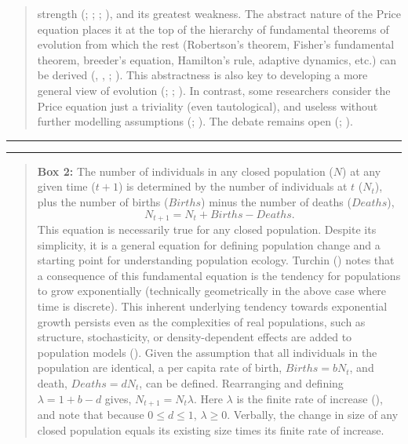 \documentclass[
]{article}
\begin{document}
\begin{quote}
strength (;
; ; ), and its
greatest weakness. The abstract nature of the Price equation places it
at the top of the hierarchy of fundamental theorems of evolution from
which the rest (Robertson's theorem, Fisher's fundamental theorem,
breeder's equation, Hamilton's rule, adaptive dynamics, etc.) can be
derived (,
, ;
). This abstractness is also key
to developing a more general view of evolution
(; ; ). In
contrast, some researchers consider the Price equation just a triviality
(even tautological), and useless without further modelling assumptions
(;
). The debate
remains open (;
).
\end{quote}

\begin{center}\rule{0.5\linewidth}{0.5pt}\end{center}

\begin{center}\rule{0.5\linewidth}{0.5pt}\end{center}

\begin{quote}
\textbf{Box 2:} The number of individuals in any closed population
(\(N\)) at any given time (\(t + 1\)) is determined by the number of
individuals at \(t\) (\(N_{t}\)), plus the number of births (\(Births\))
minus the number of deaths (\(Deaths\)),
\[N_{t+1} = N_{t} + Births - Deaths.\] This equation is necessarily true
for any closed population. Despite its simplicity, it is a general
equation for defining population change and a starting point for
understanding population ecology. Turchin
() notes that a consequence of this
fundamental equation is the tendency for populations to grow
exponentially (technically geometrically in the above case where time is
discrete). This inherent underlying tendency towards exponential growth
persists even as the complexities of real populations, such as
structure, stochasticity, or density-dependent effects are added to
population models (). Given the
assumption that all individuals in the population are identical, a per
capita rate of birth, \(Births = bN_{t}\), and death,
\(Deaths = dN_{t}\), can be defined. Rearranging and defining
\(\lambda = 1 + b - d\) gives, \(N_{t+1} = N_{t}\lambda\). Here
\(\lambda\) is the finite rate of increase
(), and note that because
\(0 \leq d \leq 1\), \(\lambda \geq 0\). Verbally, the change in size of
any closed population equals its existing size times its finite rate of
increase.
\end{quote}
\end{document}
